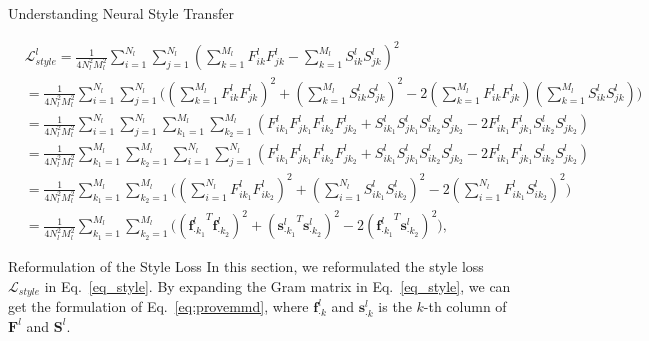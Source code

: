 \documentclass{article}
\newcommand{\col}[2]{#1_{\cdot #2}}
\begin{document}
\begin{section}{Understanding Neural Style Transfer}
\begin{figure*}[hbtp]
\begin{footnotesize}
\begin{equation}\label{eq:provemmd}
\begin{aligned}
&\mathcal{L}_{style}^l = \frac{1}{4N_l^2M_l^2}\sum_{i=1}^{N_l}\sum_{j=1}^{N_l}(\sum_{k=1}^{M_l}F_{ik}^lF_{jk}^l - \sum_{k=1}^{M_l}S_{ik}^lS_{jk}^l)^2\\
&=  \frac{1}{4N_l^2M_l^2}\sum_{i=1}^{N_l}\sum_{j=1}^{N_l}\Big( 
		(\sum_{k=1}^{M_l}F_{ik}^lF_{jk}^l)^2 +
		(\sum_{k=1}^{M_l}S_{ik}^lS_{jk}^l)^2 -
		2(\sum_{k=1}^{M_l}F_{ik}^lF_{jk}^l)(\sum_{k=1}^{M_l}S_{ik}^lS_{jk}^l) \Big)\\
&=  \frac{1}{4N_l^2M_l^2}\sum_{i=1}^{N_l}\sum_{j=1}^{N_l}\sum_{k_1=1}^{M_l}\sum_{k_2=1}^{M_l} ( F_{ik_1}^l F_{jk_1}^l F_{ik_2}^l F_{jk_2}^l + 
S_{ik_1}^l S_{jk_1}^l S_{ik_2}^l S_{jk_2}^l - 2 F_{ik_1}^l F_{jk_1}^l  S_{ik_2}^l S_{jk_2}^l)\\
&= \frac{1}{4N_l^2M_l^2}\sum_{k_1=1}^{M_l}\sum_{k_2=1}^{M_l} \sum_{i=1}^{N_l}\sum_{j=1}^{N_l} ( F_{ik_1}^l F_{jk_1}^l F_{ik_2}^l F_{jk_2}^l + 
S_{ik_1}^l S_{jk_1}^l S_{ik_2}^l S_{jk_2}^l - 2 F_{ik_1}^l F_{jk_1}^l  S_{ik_2}^l S_{jk_2}^l)\\
&= \frac{1}{4N_l^2M_l^2}\sum_{k_1=1}^{M_l}\sum_{k_2=1}^{M_l} 
   \Big( (\sum_{i=1}^{N_l}F_{ik_1}^lF_{ik_2}^l)^2 + 
         (\sum_{i=1}^{N_l}S_{ik_1}^lS_{ik_2}^l)^2 - 
         2(\sum_{i=1}^{N_l}F_{ik_1}^lS_{ik_2}^l)^2
   \Big)\\
&= \frac{1}{4N_l^2M_l^2}\sum_{k_1=1}^{M_l} \sum_{k_2=1}^{M_l} 
   \Big(  ({\col{\mathbf{f}^l}{k_1}}^T \col{\mathbf{f}^l}{k_2} )^2  + 
   		  ({\col{\mathbf{s}^l}{k_1}}^T \col{\mathbf{s}^l}{k_2} )^2  -
   		  2 ({\col{\mathbf{f}^l}{k_1}}^T \col{\mathbf{s}^l}{k_2} )^2 
   \Big),
\end{aligned}
\end{equation}
\end{footnotesize}
\vspace{-2mm}
\end{figure*}

\begin{subsection}{Reformulation of the Style Loss}
In this section, we reformulated the style loss $\mathcal{L}_{style}$ in Eq.~\ref{eq_style}. By expanding the Gram matrix in Eq.~\ref{eq_style}, we can get the formulation of Eq.~\ref{eq:provemmd}, where $\col{\mathbf{f}^l}{k}$ and $\col{\mathbf{s}^l}{k}$ is the $k$-th column of $\mathbf{F}^l$ and $\mathbf{S}^l$.


\end{subsection}
\end{section}
\end{document}
